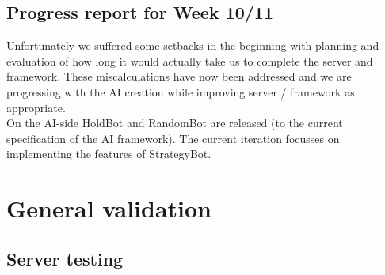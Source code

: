 \documentclass[11pt]{article}
\begin{document}
\subsection{Progress report for Week 10/11}
Unfortunately we suffered some setbacks in the beginning with planning and 
evaluation of how long it would actually take us to complete the server and
framework. These miscalculations have now been addressed and we are progressing
with the AI creation while improving server / framework as appropriate. 
\\
On the AI-side HoldBot and RandomBot are released (to the current specification of the
AI framework). The current iteration focusses on implementing the features of
StrategyBot.

\section{General validation}

\subsection{Server testing}
\end{document}
